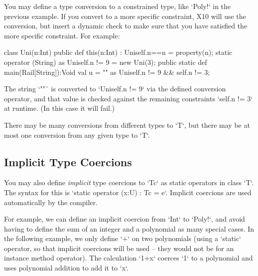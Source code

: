 You may define a type conversion to a constrained type, like \xcd`Poly!` in
the previous example.   If you convert to a more specific constraint, X10 will use
the conversion, but insert a dynamic check to make sure that you have
satisfied the more specific constraint.  For example: 
\begin{xten}
class Uni(n:Int) {
  public def this(n:Int) : Uni{self.n==n} = {property(n);}
  static operator (String) as Uni{self.n != 9} = new Uni(3);
  public static def main(Rail[String]):Void {
    val u = "" as Uni{self.n != 9 && self.n != 3};
  }
}
\end{xten}
%
The string \xcd`""` is converted to \xcd`Uni{self.n != 9}` via the defined
conversion operator, and that value is checked against the remaining
constraints \xcd`{self.n != 3}` at runtime.  (In this case it will fail.)

There may be many conversions from different types to \xcd`T`, but there may
be at most one conversion from any given type to \xcd`T`. 


\subsection{Implicit Type Coercions}

You may also define {\em implicit} type coercions to \xcd`T{c}` as static
operators in class \xcd`T`.  The syntax for this is
\xcd`static operator (x:U) : T{c} = e`.
Implicit coercions are used automatically by the compiler.  

For example, we can define an implicit coercion from \xcd`Int` to \xcd`Poly!`,
and avoid having to define the sum of an integer and a polynomial
as many special cases.  In the following example, we only define \xcd`+` on
two polynomials (using a \xcd`static` operator, so that implicit coercions
will be used -- they would not be for an instance method operator).  The
calculation \xcd`1+x` coerces \xcd`1` to a polynomial and uses polynomial
addition to add it to \xcd`x`.


